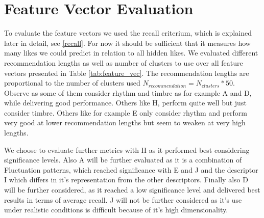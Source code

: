 \documentclass[cic,tc,english]{iiufrgs}
\begin{document}
\section{Feature Vector Evaluation}
To evaluate the feature vectors we used the recall criterium, which is explained later in detail, see \ref{recall}. For now it should be sufficient that it measures how many likes we could predict in relation to all hidden likes. We evaluated different recommendation lengths as well as number of clusters to use over all feature vectors presented in Table \ref{tab:feature_vec}. The recommendation lengths are proportional to the number of clusters used $N_{recommendation} = N_{clusters} * 50$.  Observe as some of them consider rhythm and timbre as for example A and D, while delivering good performance. Others like H, perform quite well but just consider timbre. Others like for example E only consider rhythm and perform very good at lower recommendation lengths but seem to weaken at very high lengths. 

We choose to evaluate further metrics with H as it performed best considering significance levels. Also A will be further evaluated as it is a combination of Fluctuation patterns, which reached significance with E and J and the descriptor I which differs in it's representation from the other descriptors. Finally also D will be further considered, as it reached a low significance level and delivered best results in terms of average recall. J will not be further considered as it's use under realistic conditions is difficult because of it's high dimensionality.
\end{document}
